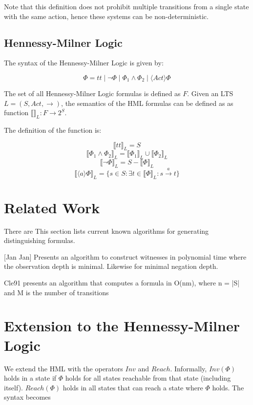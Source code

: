\documentclass[runningheads]{llncs}
\begin{document}
Note that this definition does not prohibit multiple transitions from a single state with the same action, hence these systems can be non-deterministic.

\subsection{Hennessy-Milner Logic}
The syntax of the Hennessy-Milner Logic is given by:

$$\Phi = tt \mid \neg \Phi \mid \Phi_1 \land \Phi_2 \mid \langle Act\rangle \Phi $$

The set of all Hennessy-Milner Logic formulas is defined as $F$. Given an LTS $L = (S, Act, \rightarrow)$, the semantics of the HML formulas can be defined as as function $\llbracket \rrbracket_L : F \rightarrow 2^S$.

The definition of the function is:

    $$\llbracket tt \rrbracket_L = S$$
    $$\llbracket \Phi_1 \land \Phi_2 \rrbracket_L = \llbracket \Phi_1 \rrbracket_L \cup \llbracket \Phi_2 \rrbracket_L$$
    $$\llbracket \neg \Phi \rrbracket_L = S - \llbracket \Phi \rrbracket_L $$
    $$\llbracket \langle a \rangle \Phi \rrbracket_L = \{s \in S : \exists t \in \llbracket \Phi \rrbracket_L : s \xrightarrow{a} t \} $$



\section{Related Work}
There are 
This section lists current known algorithms for generating distinguishing formulas.

[Jan Jan] Presents an algorithm to construct witnesses in polynomial time where the observation depth is minimal. Likewise for minimal negation depth.

Cle91 presents an algorithm that computes a formula in O(nm), where n = |S| and M is the number of transitions

\section{Extension to the Hennessy-Milner Logic}
We extend the HML with the operators $Inv$ and $Reach$. Informally, $Inv(\Phi)$ holds in a state if $\Phi$ holds for all states reachable from that state (including itself). $Reach(\Phi)$ holds in all states that can reach a state where $\Phi$ holds. The syntax becomes
\end{document}

